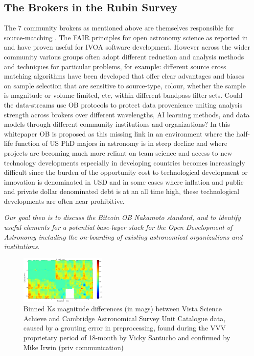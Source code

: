 \documentclass[final,5p,times,twocolumn,authoryear]{elsarticle}
\begin{document}
\subsection{ The Brokers in the Rubin Survey }

The 7 community brokers as mentioned above are  themselves responsible for source-matching \citep{bellm19}. The FAIR principles for open astronomy science as reported in \cite{2022arXiv220310710O} and \cite{molinaro21} have proven useful for IVOA software development. However across the wider community various groups often adopt different reduction and analysis methods and techniques for particular problems, for example: different source cross matching algorithms have been developed that offer clear advantages and biases on sample selection that are sensitive to source-type, colour, whether the sample is magnitude or volume limited, etc,  within  different bandpass filter sets.
 Could the data-streams use OB protocols to protect data provenience uniting analysis strength across brokers over different wavelengths, AI learning methods, and data models through different community institutions and organizations? In this whitepaper OB is proposed as this missing link in an environment where the half-life function of US PhD majors in astronomy is in steep decline and where projects are becoming much more reliant on team science and access to new technology developments especially in developing countries becomes increasingly difficult since the burden of the opportunity cost to technological development or innovation is denominated in USD and in some cases where inflation and public and private dollar denominated debt is at an all time high, these technological developments are often near prohibitive.

\emph{Our goal then is to discuss the Bitcoin OB Nakamoto standard, and to identify useful elements for a potential base-layer stack for the Open Development of Astronomy including the on-boarding of existing astronomical organizations and institutions.}

\begin{figure}
    \centering
    \includegraphics[width=0.38\textwidth]{figs/mapa_dif_Kvsa_Kcasu_grid80_1}
    \vspace*{-0.2cm}
    \caption{Binned Ks magnitude differences (in mags) between Vista Science Achieve and Cambridge Astronomical Survey Unit Catalogue data, caused by a grouting error in preprocessing, found during the VVV proprietary period of 18-month by Vicky Santucho and confirmed by Mike Irwin (priv communication)}
    \label{fig:mapa_dif_Kvsa_Kcasu_grid80_1}
\end{figure}
\end{document}
